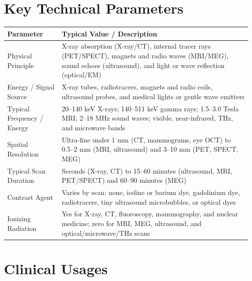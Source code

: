 \section{Key Technical Parameters}
\noindent
\begin{tabularx}{\textwidth}{@{}l X@{}}
\toprule
\textbf{Parameter} & \textbf{Typical Value / Description} \\
\midrule
Physical Principle & X-ray absorption (X-ray/CT), internal tracer rays (PET/SPECT), magnets and radio waves (MRI/MEG), sound echoes (ultrasound), and light or wave reflection (optical/EM) \\
Energy / Signal Source & X-ray tubes, radiotracers, magnets and radio coils, ultrasound probes, and medical lights or gentle wave emitters \\
Typical Frequency / Energy & 20--140 keV X-rays; 140--511 keV gamma rays; 1.5--3.0 Tesla MRI; 2--18 MHz sound waves; visible, near-infrared, THz, and microwave bands \\
Spatial Resolution & Ultra-fine under 1 mm (CT, mammograms, eye OCT) to 0.5--2 mm (MRI, ultrasound) and 3--10 mm (PET, SPECT, MEG) \\
Typical Scan Duration & Seconds (X-ray, CT) to 15--60 minutes (ultrasound, MRI, PET/SPECT) and 60--90 minutes (MEG) \\
Contrast Agent & Varies by scan: none, iodine or barium dye, gadolinium dye, radiotracers, tiny ultrasound microbubbles, or optical dyes \\
Ionizing Radiation & Yes for X-ray, CT, fluoroscopy, mammography, and nuclear medicine; zero for MRI, MEG, ultrasound, and optical/microwave/THz scans \\
\bottomrule
\end{tabularx}

\section{Clinical Usages}

